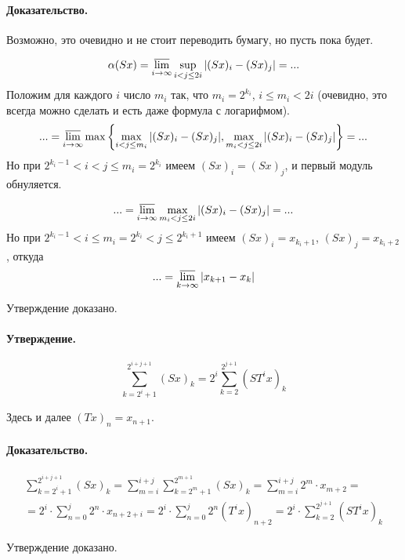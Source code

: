\documentclass[a4paper,14pt]{article} %
\begin{document}
\paragraph{Доказательство.}
Возможно, это очевидно и не стоит переводить бумагу, но пусть пока будет.

\begin{equation*}
	\alpha(Sx) =
	\varlimsup_{i\to\infty} \sup_{i < j \leq 2i} | (Sx)_i - (Sx)_j | = ...
\end{equation*}
Положим для каждого $i$ число $m_i$ так,
что $m_i = 2^{k_i}$, $i \leq m_i < 2i$
(очевидно, это всегда можно сделать и есть даже формула с логарифмом).
\begin{equation*}
	... =
	\varlimsup_{i\to\infty} \max \left\{
		\max_{i   < j \leq m_i} | (Sx)_i - (Sx)_j |,
		\max_{m_i < j \leq 2i } | (Sx)_i - (Sx)_j |
	\right\} =
	...
\end{equation*}
Но при $2^{k_i - 1} < i < j \leq m_i = 2^{k_i}$
имеем $(Sx)_i = (Sx)_j$, и первый модуль обнуляется.

\begin{equation*}
	... =
	\varlimsup_{i\to\infty}
		\max_{m_i < j \leq 2i } | (Sx)_i - (Sx)_j |
	=
	...
\end{equation*}
Но при $2^{k_i - 1} < i \leq m_i = 2^{k_i} < j \leq 2^{k_i+1}$
имеем $(Sx)_i = x_{k_i+1}$, $(Sx)_j = x_{k_i+2}$, откуда
\begin{equation}\label{alpha_S_sosedi}
	... =
	\varlimsup_{k\to\infty}
		| x_{k+1} - x_k |
\end{equation}

Утверждение доказано.

\paragraph{Утверждение.}
\begin{equation}\label{summa_S}
	\sum_{k=2^i+1}^{2^{i+j+1}} (Sx)_k =
	2^i\sum_{k=2}^{2^{j+1}} (ST^ix)_k
\end{equation}

Здесь и далее $(Tx)_n = x_{n+1}$.

\paragraph{Доказательство.}

\begin{multline*}
	\sum_{k=2^i+1}^{2^{i+j+1}} (Sx)_k =
	\sum_{m = i}^{i+j}\sum_{k=2^m+1}^{2^{m+1}} (Sx)_k =
	\sum_{m = i}^{i+j}2^m \cdot x_{m+2} =
	\\=
	2^i \cdot \sum_{n = 0}^{j}2^n \cdot x_{n+2+i} =
	2^i \cdot \sum_{n = 0}^{j}2^n (T^i x)_{n+2} =
	2^i \cdot \sum_{k=2}^{2^{j+1}} (ST^i x)_k
\end{multline*}

Утверждение доказано.
\end{document}

